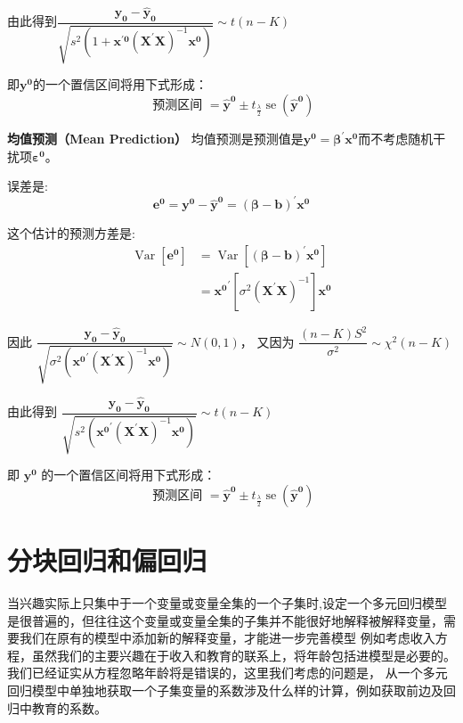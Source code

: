 由此得到$ \dfrac{\boldsymbol{y_{0}-\hat{y}_{0}}}
    {\sqrt{s^{2}\left(1+\boldsymbol{x^{\prime 0}} \left(\boldsymbol{X^{\prime} X}\right)^{-1} \boldsymbol{x^{0}}\right)}} \sim t(n-K) $

即$ \boldsymbol{y^{0}} $的一个置信区间将用下式形成：
$$ \text { 预测区间 } = \boldsymbol{\hat{y}^{0}} \pm t_{ \frac{\lambda}{2} } \operatorname{se}\left( \boldsymbol{\hat{y}^{0}}\right) $$

{\bf 均值预测（Mean Prediction）}
均值预测是预测值是$ \boldsymbol{y^{0} = \beta^{\prime} x^{0}} $而不考虑随机干扰项$ \boldsymbol{\varepsilon^{0}} $。

误差是:
$$ \boldsymbol{e^{0}=y^{0}-\hat{y}^{0}=(\beta-b)^{\prime} x^{0}} $$

这个估计的预测方差是:
$$  \begin{aligned}
        \operatorname{Var}\left[\boldsymbol{e^{0}}\right] &=\operatorname{Var}\left[\boldsymbol{(\beta-b)^{\prime} x^{0}}\right] \\
        &=\boldsymbol{{x^{0}}^{\prime}} \left[\sigma^{2}\left(\boldsymbol{X^{\prime} X}\right)^{-1}\right] \boldsymbol{x^{0}}
    \end{aligned}$$

因此 $ \dfrac{\boldsymbol{y_{0}-\hat{y}_{0}}}
        {\sqrt{\sigma^{2}\left(\boldsymbol{{x^{0}}^{\prime}}\left(\boldsymbol{X^{\prime} X}\right)^{-1} \boldsymbol{x^{0}} \right)}} \sim N(0,1) $，
又因为 $ \dfrac{(n-K) S^{2}}{\sigma^{2}} \sim \chi^{2}(n-K) $ 

由此得到 $ \dfrac{\boldsymbol{y_{0}-\hat{y}_{0}}}
        {\sqrt{s^{2}\left(\boldsymbol{{x^{0}}^{\prime}}\left( \boldsymbol{X^{\prime} X} \right)^{-1} \boldsymbol{x^{0}}\right)}} \sim t(n-K) $

即 $ \boldsymbol{y^{0}}$ 的一个置信区间将用下式形成：
$$ \text { 预测区间 } = \boldsymbol{\hat{y}^{0}} \pm t_{ \frac{\lambda}{2} } \operatorname{se}\left( \boldsymbol{\hat{y}^{0}} \right) $$

\section{分块回归和偏回归}

当兴趣实际上只集中于一个变量或变量全集的一个子集时,设定一个多元回归模型是很普遍的，但往往这个变量或变量全集的子集并不能很好地解释被解释变量，需要我们在原有的模型中添加新的解释变量，才能进一步完善模型
例如考虑收入方程，虽然我们的主要兴趣在于收入和教育的联系上，将年龄包括进模型是必要的。我们已经证实从方程忽略年龄将是错误的，这里我们考虑的问题是，
从一个多元回归模型中单独地获取一个子集变量的系数涉及什么样的计算，例如获取前边及回归中教育的系数。

